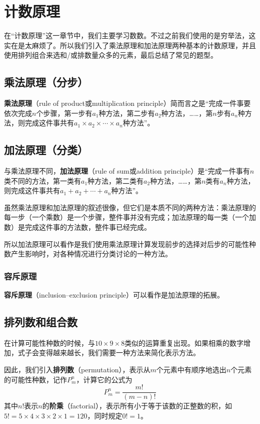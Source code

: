 \chapter{计数原理}
在“计数原理”这一章节中，我们主要学习数数。不过之前我们使用的是穷举法，这实在是太麻烦了。所以我们引入了乘法原理和加法原理两种基本的计数原理，并且使用排列组合来选和/或排数量众多的元素，最后总结了常见的题型。

\section[乘法原理]{乘法原理（分步）}
\textbf{乘法原理}（rule of product或multiplication principle）简而言之是“完成一件事要依次完成$n$个步骤，第一步有$a_1$种方法，第二步有$a_2$种方法，\ldots\ldots，第$n$步有$a_n$种方法，则完成这件事共有$a_1\times a_2 \times\cdots\times a_n$种方法”。

\section[加法原理]{加法原理（分类）}
与乘法原理不同，\textbf{加法原理}（rule of sum或addition principle）是“完成一件事有$n$类不同的方法，第一类有$a_1$种方法，第二类有$a_2$种方法，\ldots\ldots，第$n$类有$a_n$种方法，则完成这件事共有$a_1+a_2+\cdots+a_n$种方法”。

虽然乘法原理和加法原理的叙述很像，但它们是本质不同的两种方法：乘法原理的每一步（一个乘数）是一个步骤，整件事并没有完成；加法原理的每一类（一个加数）是完成这件事的方法数，整件事已经完成。

所以加法原理可以看作是我们使用乘法原理计算发现前步的选择对后步的可能性种数产生影响时，对各种情况进行分类讨论的一种方法。

\subsection{容斥原理}
\textbf{容斥原理}（inclusion–exclusion principle）可以看作是加法原理的拓展。

\section{排列数和组合数}
在计算可能性种数的时候，与$10\times 9\times 8$类似的运算重复出现。如果相乘的数字增加，式子会变得越来越长，我们需要一种方法来简化表示方法。

因此，我们引入\textbf{排列数}（permutation），表示从$m$个元素中有顺序地选出$n$个元素的可能性种数，记作$P_m^n$，计算它的公式为\[P_m^n=\frac{m!}{(m-n)!}\]其中$n!$表示$n$的\textbf{阶乘}（factorial），表示所有小于等于该数的正整数的积，如$5!=5\times 4\times 3\times 2\times 1=120$，同时规定$0!=1$。

